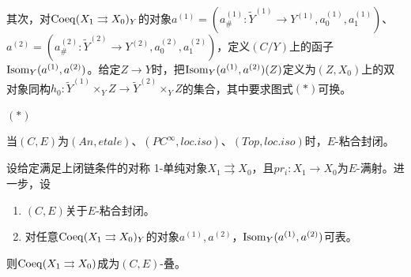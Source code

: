 其次，对$\operatorname{Coeq}(X_1\rightrightarrows X_0)_Y$的对象$a^{(1)}=(a_\#^{(1)}:\tilde Y^{(1)}\to Y^{(1)},a_0^{(1)},a_1^{(1)})$、$a^{(2)}=(a_\#^{(2)}:\tilde Y^{(2)}\to Y^{(2)},a_0^{(2)},a_1^{(2)})$，定义$(C/Y)$上的函子$\operatorname{Isom}_Y(a^{(1)},a^{(2)})$。给定$Z\to Y$时，把$\operatorname{Isom}_Y(a^{(1)},a^{(2)})(Z)$定义为$(Z,X_0)$上的双对象同构$h_0:\tilde Y^{(1)}\times_YZ\to\tilde Y^{(2)}\times_YZ$的集合，其中要求图式$(*)$可换。
\begin{center}
$(*)$\quad
{}
\end{center}

\begin{remark}
当$(C,E)$为$(An,etale)$、$(PC^\infty,loc.iso)$、$(Top,loc.iso)$时，$E$-粘合封闭。
\end{remark}

\begin{theorem}
设给定满足上闭链条件的对称 1-单纯对象$X_1\rightrightarrows X_0$，且$pr_i:X_1\to X_0$为$E$-满射。进一步，设
\begin{enumerate}[label=(\arabic*)]
\item $(C,E)$关于$E$-粘合封闭。
\item 对任意$\operatorname{Coeq}(X_1\rightrightarrows X_0)_Y$的对象$a^{(1)},a^{(2)}$，$\operatorname{Isom}_Y(a^{(1)},a^{(2)})$可表。
\end{enumerate}
则$\operatorname{Coeq}(X_1\rightrightarrows X_0)$成为$(C,E)$-叠。
\end{theorem}

